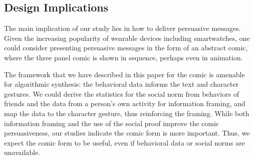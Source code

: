 \subsection{Design Implications}
The main implication of our study lies in how to deliver persuasive messages. Given the increasing popularity of wearable devices including smartwatches, one could consider presenting persuasive messages in the form of an abstract comic, where the three panel comic is shown in sequence, perhaps even in animation. 

The framework that we have described in this paper for the comic is amenable for algorithmic synthesis: the behavioral data informs the text and character gestures. We could derive the statistics for the social norm from behaviors of friends and the data from a person's own activity for information framing, and map the data to the character gesture, thus reinforcing the framing. While both information framing and the use of the social proof improve the comic persuasiveness, our studies indicate the comic form is more important. Thus, we expect the comic form to be useful, even if behavioral data or social norms are unavailable.

